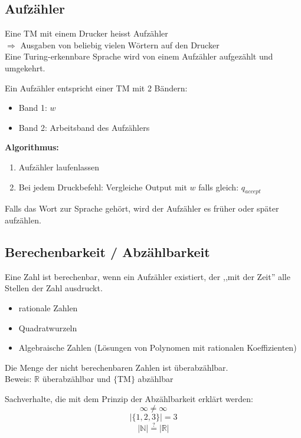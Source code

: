\documentclass[a4paper]{article}
\begin{document}
\subsection{Aufzähler}
	\begin{fdef}[Aufzähler]
	Eine TM mit einem Drucker heisst Aufzähler \\
	$\Rightarrow$ Ausgaben von beliebig vielen Wörtern auf den Drucker \\
	\hspace{2mm}
	Eine Turing-erkennbare Sprache wird von einem Aufzähler aufgezählt und umgekehrt.
	\end{fdef}
	
	\begin{falgo}
	Ein Aufzähler entspricht einer TM mit 2 Bändern:
	\begin{itemize}
		\item Band 1: $w$
		\item Band 2: Arbeitsband des Aufzählers
	\end{itemize}
		
	\textbf{Algorithmus:}
	\begin{enumerate}
		\item Aufzähler laufenlassen
		\item Bei jedem Druckbefehl: Vergleiche Output mit $w$ falls gleich: $q_{accept}$
	\end{enumerate}
	Falls das Wort zur Sprache gehört, wird der Aufzähler es früher oder später aufzählen.
	\end{falgo}

\subsection{Berechenbarkeit / Abzählbarkeit}
	Eine Zahl ist berechenbar, wenn ein Aufzähler existiert, der ,,mit der Zeit'' alle Stellen der Zahl ausdruckt.
	\begin{multicols}{2}
	\begin{fsatz}
	\begin{itemize}
		\item rationale Zahlen
		\item Quadratwurzeln
		\item Algebraische Zahlen \small{(Lösungen von Polynomen mit rationalen Koeffizienten)}
	\end{itemize}
	\end{fsatz}
	\begin{fsatz}
	Die Menge der nicht berechenbaren Zahlen ist überabzählbar.\\
	Beweis: $\mathbb{R}$ überabzählbar und $\{$TM$\}$ abzählbar
	\end{fsatz}

	\begin{fmerke}[Abzählbarkeit]
	Sachverhalte, die mit dem Prinzip der Abzählbarkeit erklärt werden:
	$$\infty \neq \infty$$
	$$|\{1,2,3\}| = 3$$
	$$|\mathbb{N}| \stackrel{?}{=} |\mathbb{R}|$$
	\end{fmerke}
	\end{multicols}
	
\end{document}
